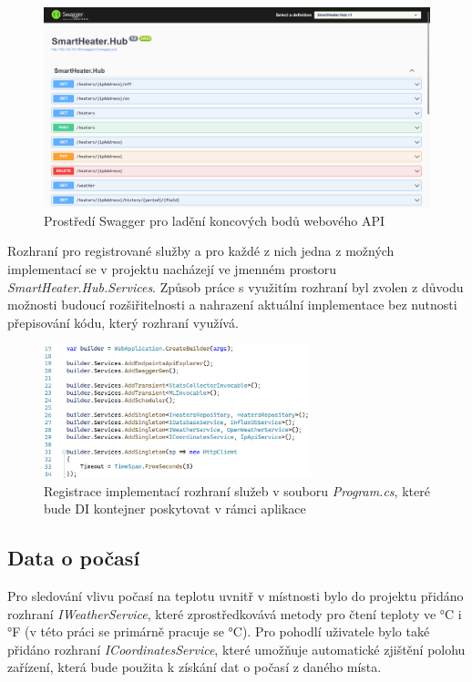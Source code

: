 \begin{figure}[hbt]
\includegraphics[width=\textwidth]{obrazky-figures/swagger.png}
\caption{Prostředí Swagger pro ladění koncových bodů webového API}
\end{figure}

Rozhraní pro registrované služby a pro každé z nich jedna z možných implementací se v projektu nacházejí ve jmenném prostoru {\it SmartHeater.Hub.Services}. Způsob práce s využitím rozhraní byl zvolen z důvodu možnosti budoucí rozšiřitelnosti a nahrazení aktuální implementace bez nutnosti přepisování kódu, který rozhraní využívá.

\begin{figure}[hbt]
\includegraphics[width=0.69\textwidth]{obrazky-figures/code-hubservices.png}
\caption{Registrace implementací rozhraní služeb v souboru {\it Program.cs}, které bude DI kontejner poskytovat v rámci aplikace}
\end{figure}

\subsection{Data o počasí}
Pro sledování vlivu počasí na teplotu uvnitř v místnosti bylo do projektu přidáno rozhraní {\it IWeatherService}, které zprostředkovává metody pro čtení teploty ve °C i °F (v této práci se primárně pracuje se °C). Pro pohodlí uživatele bylo také přidáno rozhraní {\it ICoordinatesService}, které umožňuje automatické zjištění polohu zařízení, která bude použita k získání dat o počasí z daného místa.

